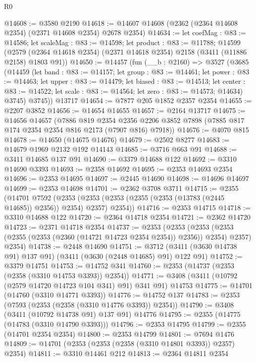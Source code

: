 \begin{lexlean}{R0}
\begin{coremodule}
@14608 := @3580 @2190
@14618 := @14607 @14608 (@2362 (@2364 @14608 @2354) (@2371 @14608 @2354) @2678 @2354)
@14634 := let coefMag : @83 := @14586;
  let scaleMag : @83 := @14598;
  let product : @83 := @11788;
  @14599 (@2579 (@2364 @14618 @2354) (@2371 @14618 @2354) @2158 (@3411 (@11886 @2158) @1803 @91))
@14650 := @14457
    (fun (__b : @2160) =>
    @3527
      (@3685
        (@14459
          (let band : @83 := @14157;
          let group : @83 := @14461;
          let power : @83 := @14463;
          let upper : @83 := @14479;
          let biased : @83 := @14513;
          let center : @83 := @14522; let scale : @83 := @14564; let zero : @83 := @14573; @14634)
          @3745)
        @3745))
    @13717
@14654 := @7877 @205 @1852 @2357 @2354
@14655 := @2207 @3852
@14656 := @14654 @14655
@14657 := @2164 @13717
@14675 := @14656
    @14657
    (@7886
      @819
      @2354
      @2356
      @2206
      @3852
      @7898
      (@7885 @817 @174 @2354 @2354 @816 @2173 (@7907 @816) @7918))
@14676 := @4070 @815
@14678 := @14650 (@14675 @14676)
@14679 := @2502 @8277
@14683 := @14679 @1969 @2132 @192 @14143
@14685 := @3716 @663 @91
@14688 := @3411 @14685 @137 @91
@14690 := @3379 @14688 @122
@14692 := @3310 @14690 @3393
@14693 := @2358 @14692
@14695 := @2353 @14693 @2354
@14696 := @2353 @14695
@14697 := @2445 @14690
@14698 := @14696 @14697
@14699 := @2353 @14698
@14701 := @2362 @3708 @3711
@14715 := @2355
    (@14701
      @7592
      (@2353 (@2353 (@2353 (@2355 (@2353 (@13783 (@2445 @14685)) @2356)) @2354) @2357) @2354))
@14716 := @2353 @14715
@14718 := @3310 @14688 @122
@14720 := @2364 @14718 @2354
@14721 := @2362 @14720
@14723 := @2371 @14718 @2354
@14737 := @2353
    (@2353
      (@2353 (@2353 (@2355 (@2353 (@2360 (@14721 @14723 @2354 @2354)) @2356)) @2354) @2357)
      @2354)
@14738 := @2448 @14690
@14751 := @3712 (@3411 (@3630 @14738 @91) @137 @91) (@3411 (@3630 (@2448 @14685) @91) @122 @91)
@14752 := @3379 @14751
@14753 := @14752 @341
@14760 := @2353 (@14737 (@2353 (@2358 (@3310 @14753 @3393)) @2354))
@14771 := @3408 (@3411 (@10792 (@2579 @14720 @14723 @104 @341) @91) @341 @91) @14753
@14775 := @14701 (@14760 (@3310 @14771 @3393))
@14776 := @14752 @137
@14783 := @2353 (@7593 (@2353 (@2358 (@3310 @14776 @3393)) @2354))
@14790 := @3408 (@3411 (@10792 @14738 @91) @137 @91) @14776
@14795 := @2355 (@14775 (@14783 (@3310 @14790 @3393)))
@14796 := @2353 @14795
@14799 := @2355 (@14701 @2354 @2354)
@14800 := @2353 @14799
@14801 := @7694 @1476
@14809 := @14701 (@2353 (@2353 (@2358 (@3310 @14801 @3393)) @2357) @2354)
@14811 := @3310 @14461 @212
@14813 := @2364 @14811 @2354

\end{coremodule}
\end{lexlean}
